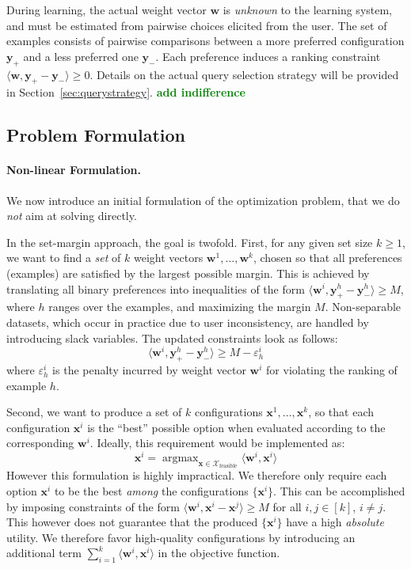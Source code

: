 \documentclass{article}
\renewcommand\[{\begin{equation}}
\renewcommand\]{\end{equation}}
\newcommand{\calvar}[1]{\ensuremath{\mathcal{#1}}}
\newcommand{\calX}{\calvar{X}}
\newcommand{\vecvar}[1]{\ensuremath{\boldsymbol{#1}}}
\newcommand{\vw}{\vecvar{w}}
\newcommand{\vx}{\vecvar{x}}
\newcommand{\vy}{\vecvar{y}}
\DeclareMathOperator*{\argmax}{argmax}
\newcommand{\stefano}[1]{{\bf \textcolor{green}{{\fbox{Stefano:} #1}}}}
\begin{document}
During learning, the actual weight vector $\vw$ is {\em unknown} to the
learning system, and must be estimated from pairwise choices elicited from the
user. The set of examples consists of pairwise comparisons between a more
preferred configuration $\vy_+$ and a less preferred one $\vy_-$. Each preference
induces a ranking constraint $\langle \vw, \vy_+ - \vy_- \rangle \ge 0$.
Details on the actual query selection strategy will be provided in
Section~\ref{sec:querystrategy}.
\stefano{add indifference}

\subsection{Problem Formulation}
\label{sec:formulation}

\paragraph{Non-linear Formulation.} We now introduce an initial formulation of
the optimization problem, that we do {\em not} aim at solving directly.

In the set-margin approach, the goal is twofold. First, for any given set size
$k\geq 1$, we want to find a {\em set} of $k$ weight vectors $\vw^{1},
\ldots, \vw^{k}$, chosen so that all preferences (examples) are satisfied by
the largest possible margin. This is achieved by translating all binary
preferences into inequalities of the form $\langle \vw^i, \vy^h_+ - \vy^h_- \rangle
\geq M$, where $h$ ranges over the examples, and maximizing the margin $M$.
Non-separable datasets, which occur in practice due to user inconsistency, are
handled by introducing slack variables. The updated constraints look as follows:
%
$$ \langle \vw^{i}, \vy^{h}_+ - \vy^{h}_- \rangle \ge M - \varepsilon^{i}_h $$
%
where $\varepsilon^{i}_h$ is the penalty incurred by weight vector $\vw^{i}$
for violating the ranking of example $h$.

Second, we want to produce a set of $k$ configurations $\vx^{1}, \ldots,
\vx^{k}$, so that each configuration $\vx^{i}$ is the ``best'' possible
option when evaluated according to the corresponding $\vw^{i}$. Ideally,
this requirement would be implemented as:
%
$$ \vx^{i} = \argmax_{\vx \in \calX_\text{feasible}} \langle \vw^{i}, \vx^{i} \rangle $$
%
However this formulation is highly impractical. We therefore only require 
each option $\vx^{i}$ to be the best {\em among} the configurations
$\{ \vx^i \}$. This can be accomplished by imposing
constraints of the form $\langle \vw^{i}, \vx^{i} - \vx^{j} \rangle \geq M$
for all $i,j\in[k]$, $i \ne j$.
This however does not guarantee that the produced $\{ \vx^{i} \}$ have a high
{\em absolute} utility. We therefore favor high-quality configurations by
introducing an additional term $\sum_{i=1}^k \langle \vw^{i}, \vx^{i} \rangle$
in the objective function.
\end{document}
